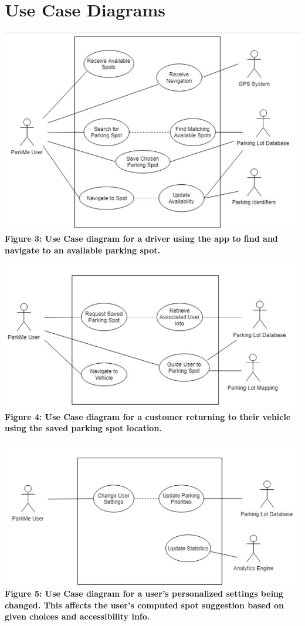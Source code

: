 \documentclass[]{article}
\begin{document}
\section{Use Case Diagrams}
\begin{center}
	\includegraphics[width=\textwidth,height=\textheight,keepaspectratio]{uc1}
	\textbf{Figure 3: Use Case diagram for a driver using the app to find and navigate to an available parking spot.}
\end{center}
\begin{center}
	\includegraphics[width=\textwidth,height=\textheight,keepaspectratio]{uc2}
	\textbf{Figure 4: Use Case diagram for a customer returning to their vehicle using the saved parking spot location.}
\end{center}
\begin{center}
	\includegraphics[width=\textwidth,height=\textheight,keepaspectratio]{uc3}
	\textbf{Figure 5: Use Case diagram for a user’s personalized settings being changed. This affects the user’s computed spot suggestion based on given choices and accessibility info.}
\end{center}
\end{document}
